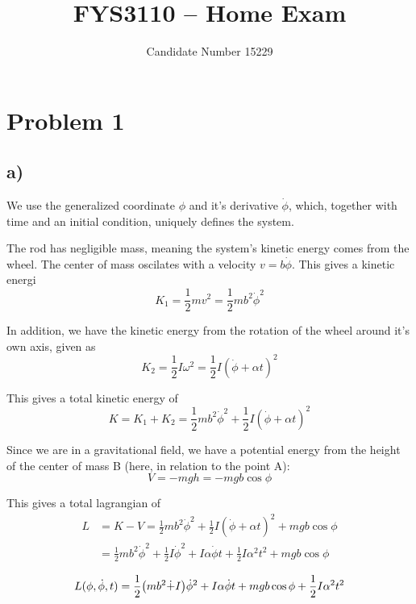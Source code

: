 \documentclass[12p,a4paper]{article}
\newcommand{\half}{\frac{1}{2}}
\begin{document}
\title{FYS3110 -- Home Exam}
\author{
    \begin{tabular}{r l}
        Candidate Number 15229
    \end{tabular}}

\maketitle

\section*{Problem 1}
\subsection*{a)}
We use the generalized coordinate $\phi$ and it's derivative $\dot{\phi}$, which, together with time and an initial condition, uniquely defines the system.

The rod has negligible mass, meaning the system's kinetic energy comes from the wheel. The center of mass oscilates with a velocity $v = b\dot{\phi}$. This gives a kinetic energi
\[
    K_1 = \half m v^2 = \half m b^2\dot{\phi}^2
\]

In addition, we have the kinetic energy from the rotation of the wheel around it's own axis, given as
\[
    K_2 = \half I\omega^2 = \half I (\dot{\phi} + \alpha t)^2
\]

This gives a total kinetic energy of
\[
    K = K_1 + K_2 = \half m b^2\dot{\phi}^2 + \half I(\dot{\phi} + \alpha t)^2
\]

Since we are in a gravitational field, we have a potential energy from the height of the center of mass B (here, in relation to the point A):
\[
    V = -mgh = -mgb\cos{\phi}
\]

This gives a total lagrangian of 
\begin{align*}
    L &= K - V = \half m b^2\dot{\phi}^2 + \half I(\dot{\phi} + \alpha t)^2 + mgb\cos{\phi} \\
    &= \half m b^2\dot{\phi}^2 + \half I \dot{\phi}^2 + I\alpha\dot{\phi}t + \half I \alpha^2 t^2 + mgb\cos{\phi} \\
\end{align*}
\begin{equation}\label{eqn:Lagr}
    L(\phi, \dot{\phi}, t) = \half \qty(m b^2\dot + I)\dot{\phi}^2 + I\alpha\dot{\phi}t + mgb\cos{\phi} + \half I \alpha^2 t^2
\end{equation}
\end{document}
